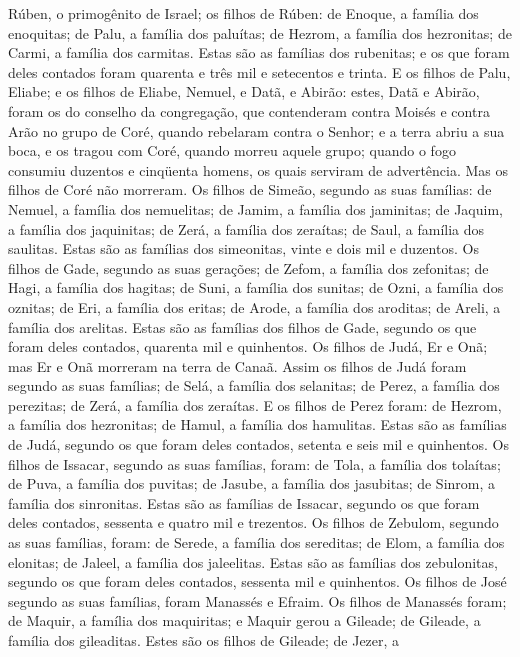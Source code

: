 Rúben, o primogênito de Israel; os filhos de Rúben: de Enoque, a
família dos enoquitas; de Palu, a família dos paluítas; de
Hezrom, a família dos hezronitas; de Carmi, a família dos carmitas.
Estas são as famílias dos rubenitas; e os que foram deles
contados foram quarenta e três mil e setecentos e trinta. E os
filhos de Palu, Eliabe; e os filhos de Eliabe, Nemuel, e Datã, e
Abirão: estes, Datã e Abirão, foram os do conselho da congregação,
que contenderam contra Moisés e contra Arão no grupo de Coré, quando
rebelaram contra o Senhor; e a terra abriu a sua boca, e os
tragou com Coré, quando morreu aquele grupo; quando o fogo consumiu
duzentos e cinqüenta homens, os quais serviram de advertência.
Mas os filhos de Coré não morreram. Os filhos de
Simeão, segundo as suas famílias: de Nemuel, a família dos
nemuelitas; de Jamim, a família dos jaminitas; de Jaquim, a família
dos jaquinitas; de Zerá, a família dos zeraítas; de Saul, a
família dos saulitas. Estas são as famílias dos simeonitas,
vinte e dois mil e duzentos. Os filhos de Gade, segundo as
suas gerações; de Zefom, a família dos zefonitas; de Hagi, a família
dos hagitas; de Suni, a família dos sunitas; de Ozni, a
família dos oznitas; de Eri, a família dos eritas; de Arode,
a família dos aroditas; de Areli, a família dos arelitas.
Estas são as famílias dos filhos de Gade, segundo os que
foram deles contados, quarenta mil e quinhentos. Os filhos de
Judá, Er e Onã; mas Er e Onã morreram na terra de Canaã.
Assim os filhos de Judá foram segundo as suas famílias; de
Selá, a família dos selanitas; de Perez, a família dos perezitas; de
Zerá, a família dos zeraítas. E os filhos de Perez foram: de
Hezrom, a família dos hezronitas; de Hamul, a família dos hamulitas.
Estas são as famílias de Judá, segundo os que foram deles
contados, setenta e seis mil e quinhentos. Os filhos de
Issacar, segundo as suas famílias, foram: de Tola, a família dos
tolaítas; de Puva, a família dos puvitas; de Jasube, a
família dos jasubitas; de Sinrom, a família dos sinronitas.
Estas são as famílias de Issacar, segundo os que foram deles
contados, sessenta e quatro mil e trezentos. Os filhos de
Zebulom, segundo as suas famílias, foram: de Serede, a família dos
sereditas; de Elom, a família dos elonitas; de Jaleel, a família dos
jaleelitas. Estas são as famílias dos zebulonitas, segundo os
que foram deles contados, sessenta mil e quinhentos. Os
filhos de José segundo as suas famílias, foram Manassés e Efraim.
Os filhos de Manassés foram; de Maquir, a família dos
maquiritas; e Maquir gerou a Gileade; de Gileade, a família dos
gileaditas. Estes são os filhos de Gileade; de Jezer, a
